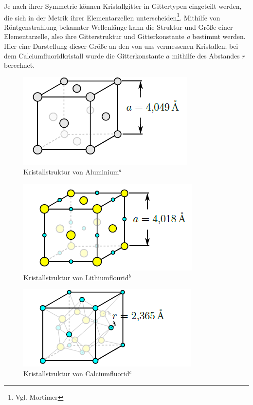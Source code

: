 \documentclass[12pt,a4paper,titlepage,headinclude,bibtotoc]{scrartcl}
\begin{document}
Je nach ihrer Symmetrie können Kristallgitter in Gittertypen eingeteilt werden, die sich in der Metrik ihrer Elementarzellen unterscheiden\footnote{Vgl. Mortimer}. Mithilfe von Röntgenstrahlung bekannter Wellenlänge kann die Struktur und Größe einer Elementarzelle, also ihre Gitterstruktur und Gitterkonstante \textit{a} bestimmt werden. Hier eine Darstellung dieser Größe an den von uns vermessenen Kristallen; bei dem Calciumfluoridkristall wurde die Gitterkonstante $a$ mithilfe des Abstandes $r$ berechnet. 



\begin{figure} [h]
\begin{center}
\includegraphics[scale=0.7]{Aluminium.png} \end{center}
\caption{Kristallstruktur von Aluminium$^a$}
\end{figure}

\begin{figure} [h]
\begin{center}
\includegraphics[scale=0.7]{Lithiumflourid.png} \end{center}
\caption{Kristallstruktur von Lithiumflourid$^b$}
\end{figure}

\begin{figure} [h]
\begin{center}
\includegraphics[scale=0.7]{Calciumflourid.png} \end{center}
\caption{Kristallstruktur von Calciumfluorid$^c$}
\end{figure}
\end{document}
